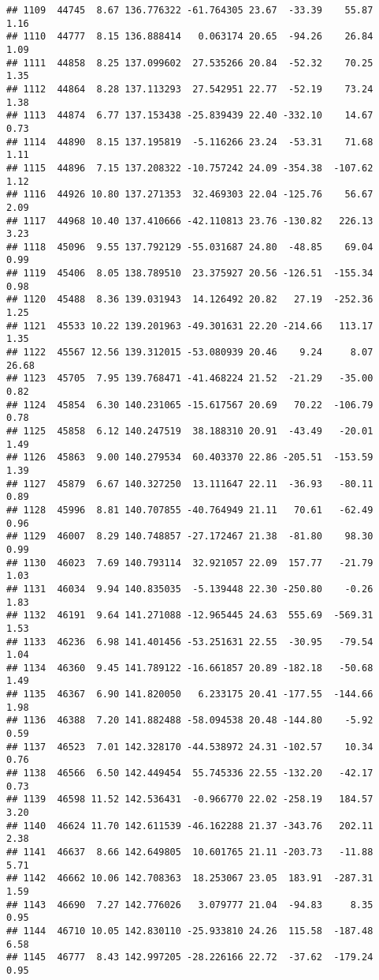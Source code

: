 \documentclass[]{article}
\begin{document}
\begin{verbatim}
## 1109  44745  8.67 136.776322 -61.764305 23.67  -33.39    55.87  1.16
## 1110  44777  8.15 136.888414   0.063174 20.65  -94.26    26.84  1.09
## 1111  44858  8.25 137.099602  27.535266 20.84  -52.32    70.25  1.35
## 1112  44864  8.28 137.113293  27.542951 22.77  -52.19    73.24  1.38
## 1113  44874  6.77 137.153438 -25.839439 22.40 -332.10    14.67  0.73
## 1114  44890  8.15 137.195819  -5.116266 23.24  -53.31    71.68  1.11
## 1115  44896  7.15 137.208322 -10.757242 24.09 -354.38  -107.62  1.12
## 1116  44926 10.80 137.271353  32.469303 22.04 -125.76    56.67  2.09
## 1117  44968 10.40 137.410666 -42.110813 23.76 -130.82   226.13  3.23
## 1118  45096  9.55 137.792129 -55.031687 24.80  -48.85    69.04  0.99
## 1119  45406  8.05 138.789510  23.375927 20.56 -126.51  -155.34  0.98
## 1120  45488  8.36 139.031943  14.126492 20.82   27.19  -252.36  1.25
## 1121  45533 10.22 139.201963 -49.301631 22.20 -214.66   113.17  1.35
## 1122  45567 12.56 139.312015 -53.080939 20.46    9.24     8.07 26.68
## 1123  45705  7.95 139.768471 -41.468224 21.52  -21.29   -35.00  0.82
## 1124  45854  6.30 140.231065 -15.617567 20.69   70.22  -106.79  0.78
## 1125  45858  6.12 140.247519  38.188310 20.91  -43.49   -20.01  1.49
## 1126  45863  9.00 140.279534  60.403370 22.86 -205.51  -153.59  1.39
## 1127  45879  6.67 140.327250  13.111647 22.11  -36.93   -80.11  0.89
## 1128  45996  8.81 140.707855 -40.764949 21.11   70.61   -62.49  0.96
## 1129  46007  8.29 140.748857 -27.172467 21.38  -81.80    98.30  0.99
## 1130  46023  7.69 140.793114  32.921057 22.09  157.77   -21.79  1.03
## 1131  46034  9.94 140.835035  -5.139448 22.30 -250.80    -0.26  1.83
## 1132  46191  9.64 141.271088 -12.965445 24.63  555.69  -569.31  1.53
## 1133  46236  6.98 141.401456 -53.251631 22.55  -30.95   -79.54  1.04
## 1134  46360  9.45 141.789122 -16.661857 20.89 -182.18   -50.68  1.49
## 1135  46367  6.90 141.820050   6.233175 20.41 -177.55  -144.66  1.98
## 1136  46388  7.20 141.882488 -58.094538 20.48 -144.80    -5.92  0.59
## 1137  46523  7.01 142.328170 -44.538972 24.31 -102.57    10.34  0.76
## 1138  46566  6.50 142.449454  55.745336 22.55 -132.20   -42.17  0.73
## 1139  46598 11.52 142.536431  -0.966770 22.02 -258.19   184.57  3.20
## 1140  46624 11.70 142.611539 -46.162288 21.37 -343.76   202.11  2.38
## 1141  46637  8.66 142.649805  10.601765 21.11 -203.73   -11.88  5.71
## 1142  46662 10.06 142.708363  18.253067 23.05  183.91  -287.31  1.59
## 1143  46690  7.27 142.776026   3.079777 21.04  -94.83     8.35  0.95
## 1144  46710 10.05 142.830110 -25.933810 24.26  115.58  -187.48  6.58
## 1145  46777  8.43 142.997205 -28.226166 22.72  -37.62  -179.24  0.95

\end{verbatim}
\end{document}
